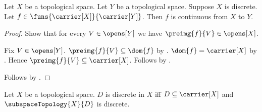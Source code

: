 \begin{theorem}\label{map_from_discrete_space_is_continuous}
    Let $X$ be a topological space.
    Let $Y$ be a topological space.
    Suppose $X$ is discrete.
    Let $f\in\funs{\carrier[X]}{\carrier[Y]}$.
    Then $f$ is continuous from $X$ to $Y$.
\end{theorem}
\begin{proof}
    Show that for every $V\in\opens[Y]$ we have
        $\preimg{f}{V}\in\opens[X]$.
    \begin{subproof}
        Fix $V\in\opens[Y]$.
        $\preimg{f}{V}\subseteq\dom{f}$ by .
        $\dom{f}=\carrier[X]$ by .
        Hence $\preimg{f}{V}\subseteq\carrier[X]$.
        Follows by .
    \end{subproof}
    Follows by .
\end{proof}

\begin{definition}\label{is_discrete_in}
    Let $X$ be a topological space.
    $D$ is discrete in $X$ iff
        $D\subseteq\carrier[X]$ and
        $\subspaceTopology{X}{D}$ is discrete.
\end{definition}


